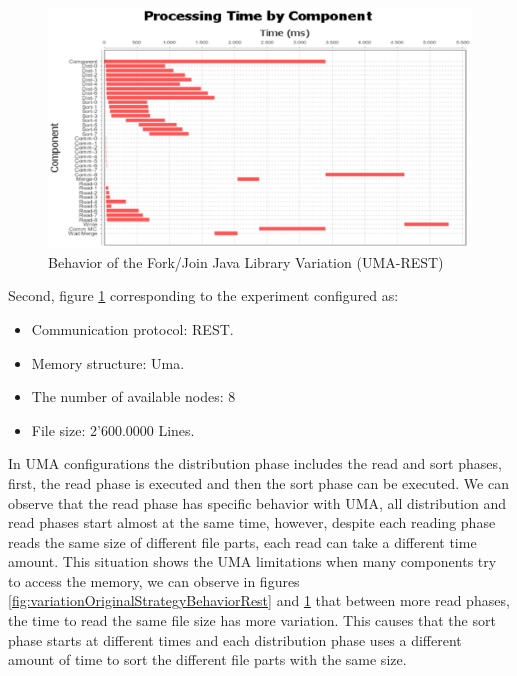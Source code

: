 \begin{figure}[H]
	\centering
	\includegraphics[trim=0.5cm 17cm -5cm 1cm, scale=0.9]{fig/FJUmaRest826Behavior.eps}
	\caption{Behavior of the Fork/Join Java Library Variation (UMA-REST)}
	\label{fig:forkJoinLibraryBehaviorRest}
\end{figure}
Second, figure \ref{fig:forkJoinLibraryBehaviorRest} corresponding to the experiment configured as: 
\begin{itemize}
	\item Communication protocol: REST.
	\item  Memory structure: Uma.
	\item The number of available nodes: 8
	\item File size: 2'600.0000 Lines.
\end{itemize}

In UMA configurations the distribution phase includes the read and sort phases, first, the read phase is executed and then the sort phase can be executed. We can observe that the read phase has specific behavior with UMA, all distribution and read phases start almost at the same time, however, despite each reading phase reads the same size of different file parts, each read can take a different time amount. This situation shows the UMA limitations when many components try to access the memory, we can observe in figures \ref{fig:variationOriginalStrategyBehaviorRest} and \ref{fig:forkJoinLibraryBehaviorRest} that between more read phases, the time to read the same file size has more variation. This causes that the sort phase starts at different times and each distribution phase uses a different amount of time to sort the different file parts with the same size.

